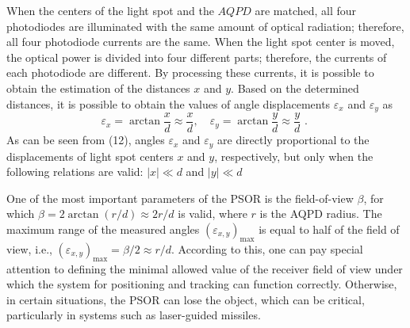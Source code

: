 \documentclass[10pt]{article}
\begin{document}
When the centers of the light spot and the \(A Q P D\) are matched, all four photodiodes are illuminated with the same amount of optical radiation; therefore, all four photodiode currents are the same. When the light spot center is moved, the optical power is divided into four different parts; therefore, the currents of each photodiode are different. By processing these currents, it is possible to obtain the estimation of the distances \(x\) and \(y .\) Based on the determined distances, it is possible to obtain the values of angle displacements \(\varepsilon_{x}\) and \(\varepsilon_{y}\) as
\[
\varepsilon_{x}=\arctan \frac{x}{d} \approx \frac{x}{d}, \quad \varepsilon_{y}=\arctan \frac{y}{d} \approx \frac{y}{d} \text { . }
\]
As can be seen from (12), angles \(\varepsilon_{x}\) and \(\varepsilon_{y}\) are directly proportional to the displacements of light spot centers \(x\) and \(y\), respectively, but only when the following relations are valid: \(|x| \ll d\) and \(|y| \ll d\)

One of the most important parameters of the PSOR is the field-of-view \(\beta\), for which \(\beta=2 \arctan (r / d) \approx 2 r / d\) is valid, where \(r\) is the AQPD radius. The maximum range of the measured angles \(\left(\varepsilon_{x, y}\right)_{\max }\) is equal to half of the field of view, i.e., \(\left(\varepsilon_{x, y}\right)_{\max }=\beta / 2 \approx r / d\). According to this, one can pay special attention to defining the minimal allowed value of the receiver field of view under which the system for positioning and tracking can function correctly. Otherwise, in certain situations, the PSOR can lose the object, which can be critical, particularly in systems such as laser-guided missiles.
\end{document}
